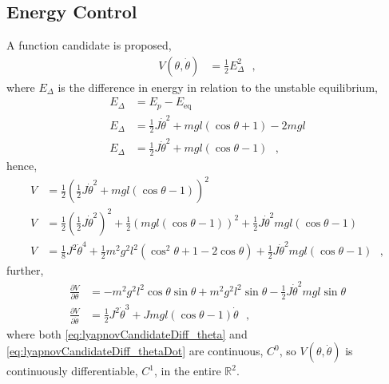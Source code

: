 \subsection{Energy Control}
A function candidate is proposed,
\begin{align}
  V(\theta, \dot{\theta}) &= \tfrac{1}{2} E_\Delta ^2 \ \ \ ,   \label{eq:lyapunovCandidate} 
\end{align}
where $E_\Delta$ is the difference in energy in relation to the unstable equilibrium,
%
\begin{align}
  E_\Delta &= E_p  - E_{\mathrm{eq}}   \label{eq:energyDelta1} \\
  E_\Delta &= \tfrac{1}{2} J \dot{\theta}^2 + m g l (\cos \theta +1) - 2 m g l  \label{eq:energyDelta2} \\
  E_\Delta &= \tfrac{1}{2} J \dot{\theta}^2 + m g l (\cos \theta -1)   \ \ \ ,  \label{eq:energyDelta3}
\end{align}
hence,
\begin{align}
  V &= \tfrac{1}{2}( \tfrac{1}{2} J \dot{\theta}^2 + m g l (\cos \theta -1)  ) ^2 \\ 
  V &= \tfrac{1}{2} (\tfrac{1}{2} J \dot{\theta}^2)^2 + \tfrac{1}{2} (m g l (\cos \theta -1)  ) ^2  +  \tfrac{1}{2} J \dot{\theta}^2  m g l (\cos \theta -1) \\
  V &= \tfrac{1}{8} J^2 \dot{\theta}^4 + \tfrac{1}{2} m^2 g^2 l^2 ( \cos^2 \theta + 1 -2\cos \theta )  +  \tfrac{1}{2} J \dot{\theta}^2  m g l (\cos \theta -1)  \ \ \ , \label{eq:lyapunovCandidate2}
\end{align}
further,
\begin{align}
\frac{\partial V}{\partial \theta}       &= -m^2 g^2 l^2 \cos \theta \sin \theta + m^2 g^2 l^2 \sin \theta - \tfrac{1}{2} J \dot{\theta}^2 m g l \sin \theta \label{eq:lyapnovCandidateDiff_theta} \\
\frac{\partial V}{\partial \dot{\theta}} &=  \tfrac{1}{2} J^2 \dot{\theta}^3 + J m g l ( \cos \theta - 1 ) \dot{\theta} \ \ \ ,  \label{eq:lyapnovCandidateDiff_thetaDot}
\end{align}
where both \autoref{eq:lyapnovCandidateDiff_theta} and \ref{eq:lyapnovCandidateDiff_thetaDot} are continuous, $C^0$, so $V(\theta,\dot{\theta})$ is continuously differentiable, $C^1$, in the entire $\mathbb{R}^2$.

